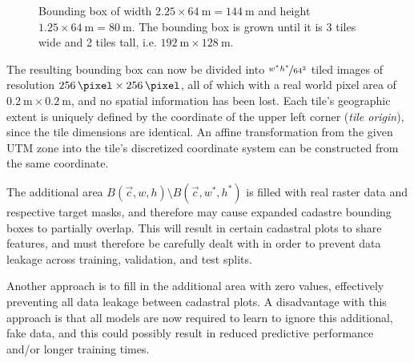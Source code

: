 \begin{figure}[H]
  \centering
  
  \caption{
    Bounding box of width $2.25 \times \SI{64}{\meter} = \SI{144}{\meter}$ and height $1.25 \times \SI{64}{\meter} = \SI{80}{\meter}$.
    The bounding box is grown until it is 3 tiles wide and 2 tiles tall, i.e. $\SI{192}{\meter} \times \SI{128}{\meter}$.
  }
  \label{fig:bbox-growing}
\end{figure}

The resulting bounding box can now be divided into $\nicefrac{w^*h^*}{64^2}$ tiled images of resolution $\SI{256}{\pixel} \times \SI{256}{\pixel}$, all of which with a real world pixel area of $\SI{0.2}{\meter} \times \SI{0.2}{\meter}$, and no spatial information has been lost.
Each tile's geographic extent is uniquely defined by the coordinate of the upper left corner (\textit{tile origin}), since the tile dimensions are identical.
An affine transformation from the given UTM zone into the tile's discretized coordinate system can be constructed from the same coordinate.

The additional area $B(\vec{c}, w, h) \setminus B(\vec{c}, w^*, h^*)$ is filled with real raster data and respective target masks, and therefore may cause expanded cadastre bounding boxes to partially overlap.
This will result in certain cadastral plots to share features, and must therefore be carefully dealt with in order to prevent data leakage across training, validation, and test splits.

Another approach is to fill in the additional area with zero values, effectively preventing all data leakage between cadastral plots.
A disadvantage with this approach is that all models are now required to learn to ignore this additional, fake data, and this could possibly result in reduced predictive performance and/or longer training times.
